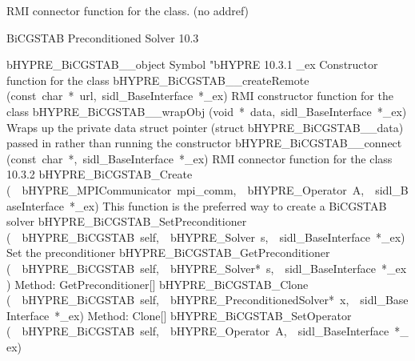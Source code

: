 \documentclass{article}
\begin{document}
\begin{cxxentry}
\begin{cxxentry}
\begin{cxxvariable}
\begin{cxxdoc}
RMI connector function for the class. (no addref)
\end{cxxdoc}
\end{cxxvariable}
\end{cxxentry}
\begin{cxxentry}
{}
        {BiCGSTAB Preconditioned Solver}
        {}
        {
}
        {10.3}
\begin{cxxnames}
        {bHYPRE\_BiCGSTAB\_\_object}
        {}
        {
Symbol "bHYPRE}
        {10.3.1}
        {\_ex}
        {}
        {
Constructor function for the class}
        {}
\label{cxx.10.3.11}
        {bHYPRE\_BiCGSTAB\_\_createRemote}
        {(const\ char\ *\ url,\ sidl\_BaseInterface\ *\_ex)}
        {
RMI constructor function for the class}
        {}
\label{cxx.10.3.12}
        {bHYPRE\_BiCGSTAB\_\_wrapObj}
        {(void\ *\ data,\ sidl\_BaseInterface\ *\_ex)}
        {
Wraps up the private data struct pointer (struct bHYPRE\_BiCGSTAB\_\_data) passed in rather than running the constructor}
        {}
\label{cxx.10.3.13}
        {bHYPRE\_BiCGSTAB\_\_connect}
        {(const\ char\ *,\ sidl\_BaseInterface\ *\_ex)}
        {
RMI connector function for the class}
        {10.3.2}
        {bHYPRE\_BiCGSTAB\_Create}
        {(\ \ bHYPRE\_MPICommunicator\ mpi\_comm,\ \ bHYPRE\_Operator\ A,\ \ sidl\_BaseInterface\ *\_ex)}
        {
This function is the preferred way to create a BiCGSTAB solver}
        {}
\label{cxx.10.3.14}
        {bHYPRE\_BiCGSTAB\_SetPreconditioner}
        {(\ \ bHYPRE\_BiCGSTAB\ self,\ \ bHYPRE\_Solver\ s,\ \ sidl\_BaseInterface\ *\_ex)}
        {
Set the preconditioner}
        {}
\label{cxx.10.3.15}
        {bHYPRE\_BiCGSTAB\_GetPreconditioner}
        {(\ \ bHYPRE\_BiCGSTAB\ self,\ \ bHYPRE\_Solver*\ s,\ \ sidl\_BaseInterface\ *\_ex)}
        {
Method:  GetPreconditioner[]}
        {}
\label{cxx.10.3.16}
        {bHYPRE\_BiCGSTAB\_Clone}
        {(\ \ bHYPRE\_BiCGSTAB\ self,\ \ bHYPRE\_PreconditionedSolver*\ x,\ \ sidl\_BaseInterface\ *\_ex)}
        {
Method:  Clone[]}
        {}
\label{cxx.10.3.17}
        {bHYPRE\_BiCGSTAB\_SetOperator}
        {(\ \ bHYPRE\_BiCGSTAB\ self,\ \ bHYPRE\_Operator\ A,\ \ sidl\_BaseInterface\ *\_ex)}

\end{cxxnames}
\end{cxxentry}
\end{cxxentry}
\end{document}
